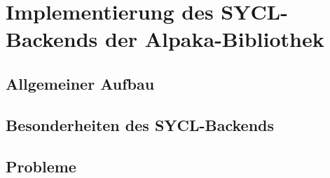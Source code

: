 \chapter{Implementierung des SYCL-Backends der Alpaka-Bibliothek}\label{implementierung}

\section{Allgemeiner Aufbau}\label{implementierung:aufbau}

\section{Besonderheiten des SYCL-Backends}\label{implementierung:besonderheiten}

\section{Probleme}\label{implementierung:probleme}
